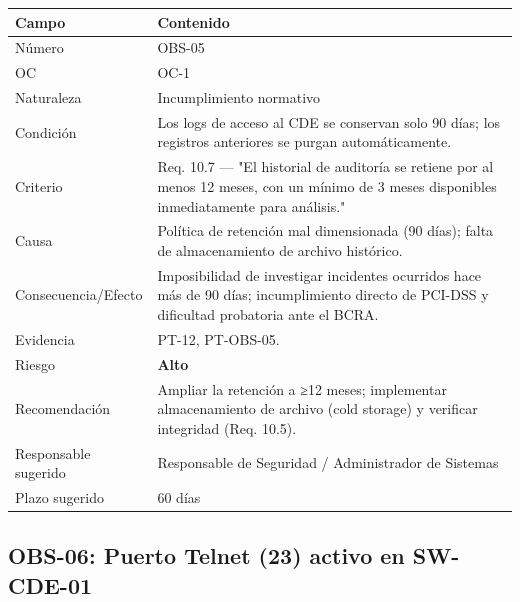 \documentclass[11pt,a4paper]{article}
\begin{document}
\begin{tabularx}{\textwidth}{P{5cm}L}
\toprule
\textbf{Campo} & \textbf{Contenido} \\
\midrule
Número & OBS-05 \\
OC & OC-1 \\
Naturaleza & Incumplimiento normativo \\
Condición & Los logs de acceso al CDE se conservan solo 90 días; los registros anteriores se purgan automáticamente. \\
Criterio & Req. 10.7 — "El historial de auditoría se retiene por al menos 12 meses, con un mínimo de 3 meses disponibles inmediatamente para análisis." \\
Causa & Política de retención mal dimensionada (90 días); falta de almacenamiento de archivo histórico. \\
Consecuencia/Efecto & Imposibilidad de investigar incidentes ocurridos hace más de 90 días; incumplimiento directo de PCI-DSS y dificultad probatoria ante el BCRA. \\
Evidencia & PT-12, PT-OBS-05. \\
Riesgo & \textbf{Alto} \\
Recomendación & Ampliar la retención a ≥12 meses; implementar almacenamiento de archivo (cold storage) y verificar integridad (Req. 10.5). \\
Responsable sugerido & Responsable de Seguridad / Administrador de Sistemas \\
Plazo sugerido & 60 días \\
\bottomrule
\end{tabularx}

\subsection{OBS-06: Puerto Telnet (23) activo en SW-CDE-01}
\end{document}
